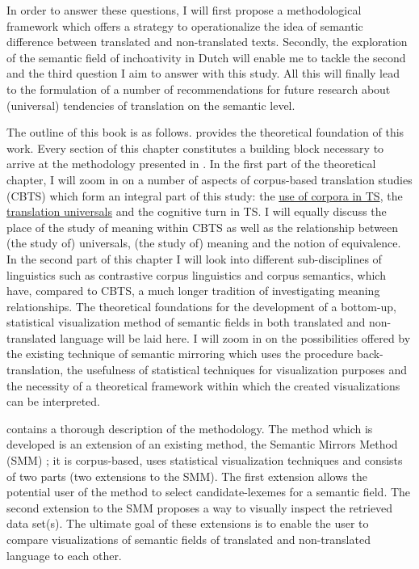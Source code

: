 In order to answer these questions, I will first propose a methodological framework which offers a strategy to operationalize the idea of semantic difference between translated and non-translated texts. Secondly, the exploration of the semantic field of inchoativity in Dutch will enable me to tackle the second and the third question I aim to answer with this study. All this will finally lead to the formulation of a number of recommendations for future research about (universal) tendencies of translation on the semantic level.

The outline of this book is as follows. \hyperlink{Chapter2Theoretical}{} provides the theoretical foundation of this work. Every section of this chapter constitutes a building block necessary to arrive at the methodology presented in \hyperlink{Chapter3Methodology}{}. In the first part of the theoretical chapter, I will zoom in on a number of aspects of corpus-based translation studies (CBTS) which form an integral part of this study: the \hyperlink{Corpora}{use of corpora in TS}, the \hyperlink{Bakersuniversals}{translation universals} and the cognitive turn in TS. I will equally discuss the place of the study of meaning within CBTS as well as the relationship between (the study of) universals, (the study of) meaning and the notion of equivalence. In the second part of this chapter I will look into different sub-disciplines of linguistics such as contrastive corpus linguistics and corpus semantics, which have, compared to CBTS, a much longer tradition of investigating meaning relationships. The theoretical foundations for the development of a bottom-up, statistical visualization method of semantic fields in both translated and non-translated language will be laid here. I will zoom in on the possibilities offered by the existing technique of semantic mirroring which uses the procedure back-translation, the usefulness of statistical techniques for visualization purposes and the necessity of a theoretical framework within which the created visualizations can be interpreted.

 contains a thorough description of the methodology. The method which is developed is an extension of an existing method, the Semantic Mirrors Method (SMM) \citep{johansson_translational_1998, aijmer_translations_2004, langemets_translations_2005}; it is corpus-based, uses statistical visualization techniques and consists of two parts (two extensions to the SMM). The first extension allows the potential user of the method to select candidate-lexemes for a semantic field. The second extension to the SMM proposes a way to visually inspect the retrieved data set(s). The ultimate goal of these extensions is to enable the user to compare visualizations of semantic fields of translated and non-translated language to each other.

